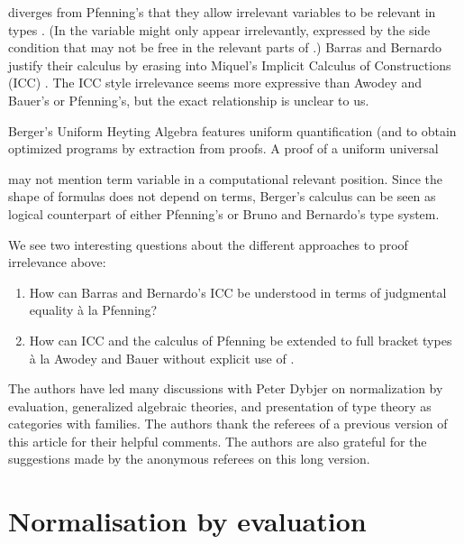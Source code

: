 \documentclass{LMCS}
\newcommand{\LONGVERSION}[1]{}
\newcommand{\SHORTVERSION}[1]{#1}
\newcommand{\LONGSHORT}[2]{\LONGVERSION{#1}\SHORTVERSION{#2}}
\newcommand{\para}[1]{
\LONGSHORT{\paragraph{\it #1.}}
          {\vspace{1ex}\noindent{\it #1.}}
}
\begin{document}
diverges from Pfenning's that they allow irrelevant variables  to
be relevant in types .  (In  the variable  might only
appear irrelevantly, expressed by the side condition that  may not be
free in the relevant parts  of .)
Barras and Bernardo justify their calculus by erasing into Miquel's
Implicit Calculus of Constructions (ICC) \cite{miquel:tlca01}. The ICC
style irrelevance seems more expressive than Awodey and Bauer's or
Pfenning's, but the exact relationship is unclear to us.



Berger's Uniform Heyting Algebra \cite{berger:uniformHA} features
uniform quantification   (and  to
obtain optimized programs by extraction from proofs.  A proof of a
uniform universal

may not mention term variable  in a computational relevant
position.  Since the shape of formulas does not depend on terms,
Berger's calculus can be seen as logical counterpart of
either Pfenning's or Bruno and Bernardo's type system.

We see two interesting questions about the different approaches to
proof irrelevance above:
\begin{enumerate}[(1)]
\item How can Barras and Bernardo's ICC be understood in
  terms of judgmental equality \`a la Pfenning?
\item How can ICC and the calculus of Pfenning be extended to full
  bracket types \`a la Awodey and Bauer without explicit use of .
\end{enumerate}

 
\para{Acknowledgments} The authors have led many discussions with Peter
Dybjer on normalization by evaluation, generalized algebraic theories,
and presentation of type theory as categories with families.  The
authors thank the referees of a previous version of this article for
their helpful comments. The authors are also grateful for the
suggestions made by the anonymous referees on this long version. 




\appendix

\section{Normalisation by evaluation}
\label{sec:nbealg}
\end{document}
